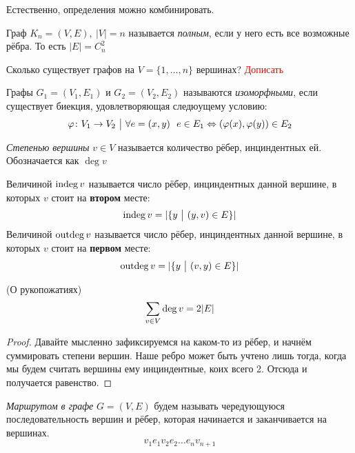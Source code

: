 \begin{note}
	Естественно, определения можно комбинировать.
\end{note}

\begin{definition}
	Граф $K_n = (V, E),\ |V| = n$ называется \textit{полным}, если у него есть все возможные рёбра. То есть $|E| = C_n^2$
\end{definition}

\begin{example}
	Сколько существует графов на $V = \{1, \ldots, n\}$ вершинах?
	\textcolor{red}{Дописать}
\end{example}

\begin{definition}
	Графы $G_1 = (V_1, E_1)$ и $G_2 = (V_2, E_2)$ называются \textit{изоморфными}, если существует биекция, удовлетворяющая следюущему условию:
	\[
		\varphi \colon V_1 \to V_2 \ \big|\  \forall e = (x, y)\ \ e \in E_1 \Leftrightarrow (\varphi(x), \varphi(y)) \in E_2
	\]
\end{definition}

\begin{definition}
	\textit{Степенью вершины} $v \in V$ называется количество рёбер, инциндентных ей. Обозначается как $\deg v$
\end{definition}

\begin{definition}
	Величиной $\operatorname{indeg} v$ называется число рёбер, инциндентных данной вершине, в которых $v$ стоит на \textbf{втором} месте:
	\[
		\operatorname{indeg} v = |\{y \ \big|\  (y, v) \in E\}|
	\]
	Величиной $\operatorname{outdeg} v$ называется число рёбер, инциндентных данной вершине, в которых $v$ стоит на \textbf{первом} месте:
	\[
		\operatorname{outdeg} v = |\{y \ \big|\  (v, y) \in E\}|
	\]
\end{definition}

\begin{lemma} (О рукопожатиях)
	\[
		\sum\limits_{v \in V} \deg v = 2|E|
	\]
\end{lemma}

\begin{proof}
	Давайте мысленно зафиксируемся на каком-то из рёбер, и начнём суммировать степени вершин. Наше ребро может быть учтено лишь тогда, когда мы будем считать вершины ему инциндентные, коих всего 2. Отсюда и получается равенство.
\end{proof}

\begin{definition}
	\textit{Маршрутом в графе} $G = (V, E)$ будем называть чередующуюся последовательность вершин и рёбер, которая начинается и заканчивается на вершинах.
	\[
		v_1 e_1 v_2 e_2 \ldots e_n v_{n + 1}
	\]
\end{definition}

